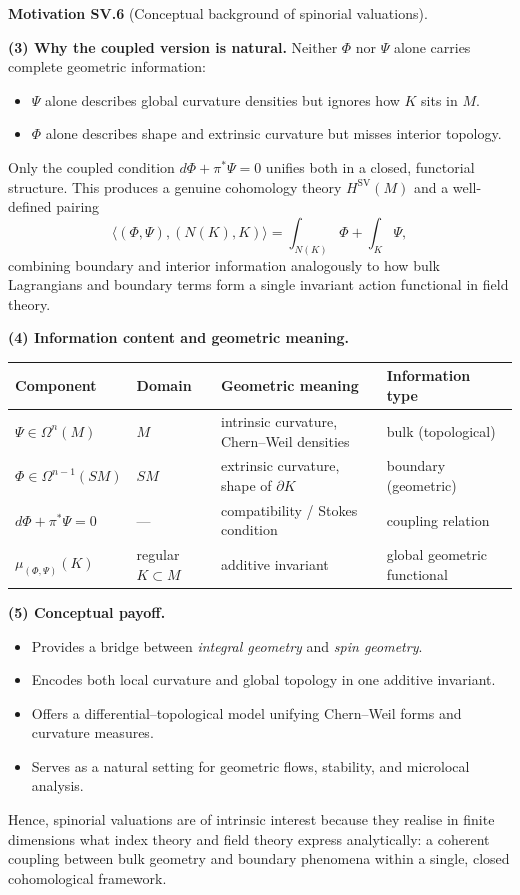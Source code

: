 \documentclass[10pt, letterpaper]{article}
\newcommand{\CustomHeading}[3]{%
  \par\medskip\noindent%
  \textbf{#1 #2} \textnormal{(#3)}.\enskip%
}
\newenvironment{MOT}[2]{\begin{unitbox}\CustomHeading{Motivation}{#1}{#2}}{\end{unitbox}}
\begin{document}
\begin{MOT}{SV.6}{Conceptual background of spinorial valuations}
\medskip\noindent
\textbf{(3) Why the coupled version is natural.}
Neither $\Phi$ nor $\Psi$ alone carries complete geometric information:
\begin{itemize}
  \item $\Psi$ alone describes global curvature densities but ignores how $K$ sits in $M$.
  \item $\Phi$ alone describes shape and extrinsic curvature but misses interior topology.
\end{itemize}
Only the coupled condition $d\Phi+\pi^*\Psi=0$ unifies both in a closed, functorial structure.
This produces a genuine cohomology theory $H^{\operatorname{SV}}(M)$ and a well-defined pairing
\[
\langle (\Phi,\Psi),(N(K),K)\rangle=\int_{N(K)}\Phi+\int_K\Psi,
\]
combining boundary and interior information analogously to how bulk Lagrangians and boundary terms form a single invariant action functional in field theory.

\medskip\noindent
\textbf{(4) Information content and geometric meaning.}
\begin{center}
\begin{tabular}{l|l|l|l}
Component & Domain & Geometric meaning & Information type \\
\hline
$\Psi\in\Omega^n(M)$ & $M$ & intrinsic curvature, Chern--Weil densities & bulk (topological) \\
$\Phi\in\Omega^{n-1}(SM)$ & $SM$ & extrinsic curvature, shape of $\partial K$ & boundary (geometric) \\
$d\Phi+\pi^*\Psi=0$ & --- & compatibility / Stokes condition & coupling relation \\
$\mu_{(\Phi,\Psi)}(K)$ & regular $K\subset M$ & additive invariant & global geometric functional
\end{tabular}
\end{center}

\medskip\noindent
\textbf{(5) Conceptual payoff.}
\begin{itemize}
  \item Provides a bridge between \emph{integral geometry} and \emph{spin geometry}.
  \item Encodes both local curvature and global topology in one additive invariant.
  \item Offers a differential--topological model unifying Chern--Weil forms and curvature measures.
  \item Serves as a natural setting for geometric flows, stability, and microlocal analysis.
\end{itemize}
Hence, spinorial valuations are of intrinsic interest because they realise in finite dimensions what index theory and field theory express analytically:
a coherent coupling between bulk geometry and boundary phenomena within a single, closed cohomological framework.

\end{MOT}
\end{document}
